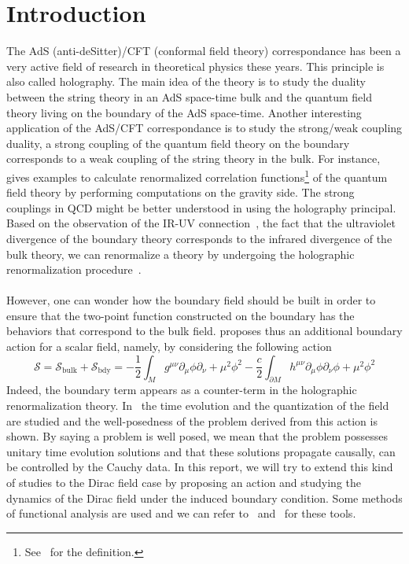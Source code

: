 \section{Introduction}
The AdS (anti-deSitter)/CFT (conformal field theory) correspondance has been a very active field of research in theoretical physics these years. 
This principle is also called holography.
The main idea of the theory is to study the duality between the string theory in an AdS space-time bulk and the quantum field theory living on the boundary of the AdS space-time.
Another interesting application of the AdS/CFT correspondance is to study the strong/weak coupling duality, \ie
a strong coupling of the quantum field theory on the boundary corresponds to a weak coupling of the string theory in the bulk. 
For instance,~\cite{Skenderis2002} gives examples to calculate renormalized correlation functions\footnote{
See~\eg\cite{Peskin1995} for the definition.
} of the quantum field theory by performing computations on the gravity side.
The strong couplings in QCD might be better understood in using the holography principal. 
Based on the observation of the IR-UV connection~\cite{Susskind1998}, 
\ie the fact that the ultraviolet divergence of the boundary theory corresponds to the infrared divergence of the bulk theory, 
we can renormalize a theory by undergoing the holographic renormalization procedure~\cite{Skenderis2002}. \\\\
%
However, one can wonder how the boundary field should be built in order to ensure that the two-point function constructed on the boundary has the behaviors that correspond to the bulk field. 
\cite{Skenderis2002} proposes thus an additional boundary action for a scalar field, namely, by considering the following action
\begin{equation*}
\mathcal{S} = \mathcal{S}_{\mathrm{bulk}} + \mathcal{S}_{\mathrm{bdy}} = 
-\frac 1 2 \int_M g^{\mu\nu} \partial_\mu \phi \partial_{\nu} + 
\mu^2\phi^2 - \frac c 2 \int_{\partial M}h^{\mu\nu}\partial_\mu\phi\partial_\nu\phi + \mu^2\phi^2
\end{equation*}
Indeed, the boundary term appears as a counter-term in the holographic renormalization theory.
In~\cite{Zahn2016} the time evolution and the quantization of the field are studied and the well-posedness of the problem derived from this action is shown.
By saying a problem is well posed, we mean that the problem possesses unitary time evolution solutions and that these solutions propagate causally, \ie can be controlled by the Cauchy data.
In this report, we will try to extend this kind of studies to the Dirac field case by proposing an action and studying the dynamics of the Dirac field under the induced boundary condition.
Some methods of functional analysis are used and we can refer to~\cite{Reed1981} and~\cite{Reed1975} for these tools. 
%
